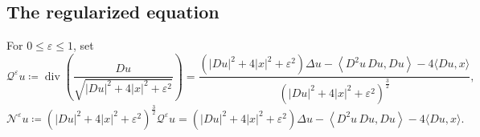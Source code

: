 \documentclass[11pt]{amsart}
\renewcommand{\leq}{\leqslant}
\newcommand{\eps}{\varepsilon}
\newcommand{\Qe}{\mathcal Q^\eps}
\newcommand{\Ne}{\mathcal N^\eps}
\DeclareMathOperator{\divv}{div}
\theoremstyle{definition}
\theoremstyle{remark}
\numberwithin{equation}{section}
\begin{document}
\subsection{The regularized equation}\label{sec_reg_eq}
 For $0\leq\eps\leq 1$, set
 \begin{equation}
 \label{eq:Qeps}
    \Qe u\coloneqq\divv\left(\frac{Du}{\sqrt{|Du|^2+4|x|^2+\eps^2}}\right)= \frac{(|Du|^2+4|x|^2+\eps^2)\Delta u-\left\langle D^2 u\, Du,Du\right\rangle-4\langle Du,x\rangle}{\left(|Du|^2+4|x|^2+\eps^2\right)^\frac{3}{2}},
\end{equation}
\begin{equation}
\label{eq:Neps}
      \Ne u \coloneqq \left(|Du|^2+4|x|^2+\eps^2\right)^\frac{3}{2}\Qe u=(|Du|^2+4|x|^2+\eps^2)\Delta u-\left\langle D^2 u\, Du,Du\right\rangle-4\langle Du,x\rangle.  
\end{equation}
\end{document}
